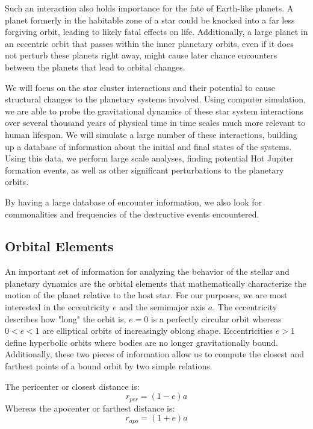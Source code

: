 \documentclass[12pt]{article}
\begin{document}
Such an interaction also holds importance for the fate of Earth-like planets.
A planet formerly in the habitable zone of a star could be knocked into a far less
forgiving orbit, leading to likely fatal effects on life. Additionally, a
large planet in an eccentric orbit that passes within the inner planetary orbits,
even if it does not perturb these planets right away, might cause later chance
encounters between the planets that lead to orbital changes.

We will focus on the star cluster interactions and their potential to 
cause structural changes to the planetary systems involved. Using computer simulation,
we are able to probe the gravitational dynamics of these star system 
interactions over several thousand years of physical time 
in time scales much more relevant to human lifespan. We will simulate
a large number of these interactions, building up a database of information about
the initial and final states of the systems. Using this data, we perform large
scale analyses, finding potential Hot Jupiter formation events, as well as other
significant perturbations to the planetary orbits.

By having a large database of encounter information, we also look for commonalities
and frequencies of the destructive events encountered. 


\subsection{Orbital Elements}

    An important set of information for analyzing the behavior of the stellar and
    planetary dynamics are the orbital elements that mathematically 
    characterize the motion of the planet relative to the host star. 
    For our purposes, we are most interested in the eccentricity $e$ and the
    semimajor axis $a$. The eccentricity describes how "long" the orbit is, $e=0$
    is a perfectly circular orbit whereas $0<e<1$ are elliptical orbits of increasingly
    oblong shape. Eccentricities $e>1$ define hyperbolic orbits where bodies are no longer
    gravitationally bound. Additionally, these two pieces of information allow us to 
    compute the closest and farthest points of a bound orbit by two simple relations.

    The pericenter or closest distance is:
    \begin{equation}
        r_{per} = (1 - e) a
    \end{equation}
    Whereas the apocenter or farthest distance is:
    \begin{equation}
        r_{apo} = (1 + e) a
    \end{equation}
\end{document}

